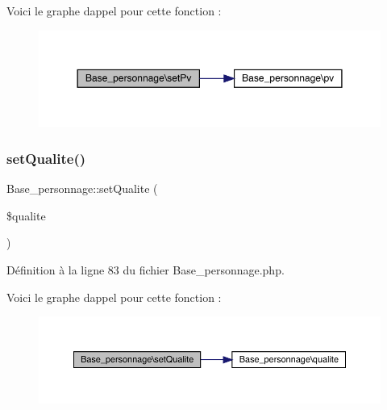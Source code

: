 Voici le graphe d\textquotesingle{}appel pour cette fonction \+:\nopagebreak
\begin{figure}[H]
\begin{center}
\leavevmode
\includegraphics[width=350pt]{class_base__personnage_aa16912b89559e2aa9c96e2d1b2cd9d4f_cgraph}
\end{center}
\end{figure}
\mbox{\label{class_base__personnage_a05dbaa079c1220db181bd98a204ffead}} 
\subsubsection{\texorpdfstring{set\+Qualite()}{setQualite()}}
{\footnotesize\ttfamily Base\+\_\+personnage\+::set\+Qualite (\begin{DoxyParamCaption}\item[{}]{\$qualite }\end{DoxyParamCaption})}



Définition à la ligne 83 du fichier Base\+\_\+personnage.\+php.

Voici le graphe d\textquotesingle{}appel pour cette fonction \+:\nopagebreak
\begin{figure}[H]
\begin{center}
\leavevmode
\includegraphics[width=350pt]{class_base__personnage_a05dbaa079c1220db181bd98a204ffead_cgraph}
\end{center}
\end{figure}
\mbox{\label{class_base__personnage_a1044ae4053449cbf15bad1700e47f05d}} 
